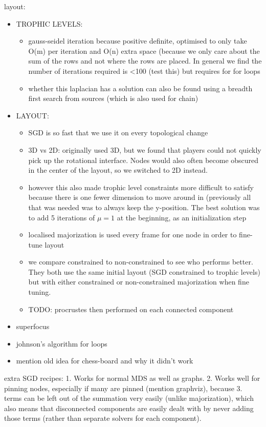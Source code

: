 layout:
\begin{itemize}
    \item TROPHIC LEVELS:
    \begin{itemize}
        \item gauss-seidel iteration because positive definite, optimised to only take O(m) per iteration and O(n) extra space (because we only care about the sum of the rows and not where the rows are placed. In general we find the number of iterations required is <100 (test this) but requires for for loops
        \item whether this laplacian has a solution can also be found using a breadth first search from sources (which is also used for chain)
    \end{itemize}
    \item LAYOUT:
    \begin{itemize}
        \item SGD is so fast that we use it on every topological change
        \item 3D vs 2D: originally used 3D, but we found that players could not quickly pick up the rotational interface. Nodes would also often become obscured in the center of the layout, so we switched to 2D instead. 
        \item however this also made trophic level constraints more difficult to satisfy because there is one fewer dimension to move around in (previously all that was needed was to always keep the y-position. The best solution was to add 5 iterations of $\mu=1$ at the beginning, as an initialization step
        \item localised majorization is used every frame for one node in order to fine-tune layout
        \item we compare constrained to non-constrained to see who performs better. They both use the same initial layout (SGD constrained to trophic levels) but with either constrained or non-constrained majorization when fine tuning.
        \item TODO: procrustes then performed on each connected component
    \end{itemize}
    
    \item superfocus
    \item johnson's algorithm for loops
    \item mention old idea for chess-board and why it didn't work
\end{itemize}

extra SGD recipes: 1. Works for normal MDS as well as graphs. 2. Works well for pinning nodes, especially if many are pinned (mention graphviz), because 3. terms can be left out of the summation very easily (unlike majorization), which also means that disconnected components are easily dealt with by never adding those terms (rather than separate solvers for each component).

